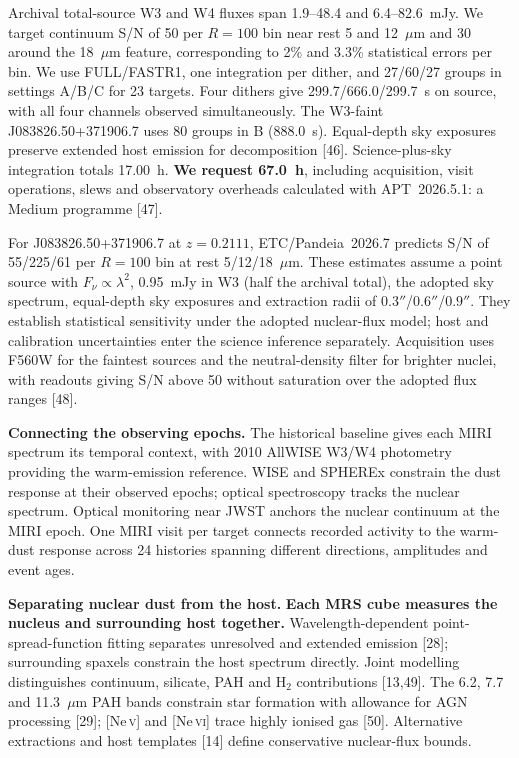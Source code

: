 \documentclass[12pt]{article}
\begin{document}
Archival total-source W3 and W4 fluxes span 1.9--48.4 and 6.4--82.6~mJy. We target continuum S/N of 50 per $R=100$ bin near rest 5 and 12~$\mu$m and 30 around the 18~$\mu$m feature, corresponding to 2\% and 3.3\% statistical errors per bin. We use FULL/FASTR1, one integration per dither, and 27/60/27 groups in settings A/B/C for 23 targets. Four dithers give 299.7/666.0/299.7~s on source, with all four channels observed simultaneously. The W3-faint J083826.50+371906.7 uses 80 groups in B (888.0~s). Equal-depth sky exposures preserve extended host emission for decomposition [46]. Science-plus-sky integration totals 17.00~h. \textbf{We request 67.0~h}, including acquisition, visit operations, slews and observatory overheads calculated with APT~2026.5.1: a Medium programme [47].

For J083826.50+371906.7 at $z=0.2111$, ETC/Pandeia~2026.7 predicts S/N of 55/225/61 per $R=100$ bin at rest 5/12/18~$\mu$m. These estimates assume a point source with $F_\nu\propto\lambda^2$, 0.95~mJy in W3 (half the archival total), the adopted sky spectrum, equal-depth sky exposures and extraction radii of $0.3''$/$0.6''$/$0.9''$. They establish statistical sensitivity under the adopted nuclear-flux model; host and calibration uncertainties enter the science inference separately. Acquisition uses F560W for the faintest sources and the neutral-density filter for brighter nuclei, with readouts giving S/N above 50 without saturation over the adopted flux ranges [48].

\noindent\textbf{Connecting the observing epochs.}
The historical baseline gives each MIRI spectrum its temporal context, with 2010 AllWISE W3/W4 photometry providing the warm-emission reference. WISE and SPHEREx constrain the dust response at their observed epochs; optical spectroscopy tracks the nuclear spectrum. Optical monitoring near JWST anchors the nuclear continuum at the MIRI epoch. One MIRI visit per target connects recorded activity to the warm-dust response across 24 histories spanning different directions, amplitudes and event ages.

\noindent\textbf{Separating nuclear dust from the host.}
\textbf{Each MRS cube measures the nucleus and surrounding host together.} Wavelength-dependent point-spread-function fitting separates unresolved and extended emission [28]; surrounding spaxels constrain the host spectrum directly. Joint modelling distinguishes continuum, silicate, PAH and H$_2$ contributions [13,49]. The 6.2, 7.7 and 11.3~$\mu$m PAH bands constrain star formation with allowance for AGN processing [29]; [Ne\,\textsc{v}] and [Ne\,\textsc{vi}] trace highly ionised gas [50]. Alternative extractions and host templates [14] define conservative nuclear-flux bounds.
\end{document}
